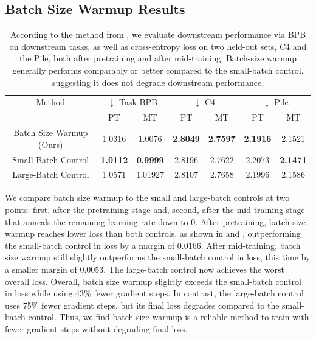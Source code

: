 \documentclass{article}
\begin{document}
\subsection{Batch Size Warmup Results}

\begin{table}[!t]
    \centering
    \begin{tabular}{c|cc|cc|cc}
        \toprule
        Method & \multicolumn{2}{c}{$\downarrow$ Task BPB} & \multicolumn{2}{|c|}{$\downarrow$ C4} & \multicolumn{2}{|c}{$\downarrow$ Pile} \\
        & PT & MT & PT & MT & PT & MT \\
        \midrule
        Batch Size Warmup (Ours) & 1.0316 & 1.0076 & \textbf{2.8049} & \textbf{2.7597} & \textbf{2.1916} & 2.1521 \\
        Small-Batch Control & \textbf{1.0112} & \textbf{0.9999} & 2.8196 & 2.7622 & 2.2073 & \textbf{2.1471} \\
        Large-Batch Control & 1.0571 & 1.01927 & 2.8107 & 2.7658 & 2.1996 & 2.1586 \\
        \bottomrule
    \end{tabular}
    \vspace{1em}
    \caption{According to the method from \cite{Bhagia2024EstablishingTS}, we evaluate downstream performance via BPB on downstream tasks, as well as cross-entropy loss on two held-out sets, C4 and the Pile, both after pretraining and after mid-training.
    Batch-size warmup generally performs comparably or better compared to the small-batch control, suggesting it does not degrade downstream performance.
    }
    \label{tab:downstream}
\end{table}

We compare batch size warmup to the small and large-batch controls at two points: first, after the pretraining stage and, second, after the mid-training stage that anneals the remaining learning rate down to 0.
After pretraining, batch size warmup reaches lower loss than both controls, as shown in  and , outperforming the small-batch control in loss by a margin of 0.0166.
After mid-training, batch size warmup still slightly outperforms the small-batch control in loss, this time by a smaller margin of 0.0053.
The large-batch control now achieves the worst overall loss.
% 
Overall, batch size warmup slightly exceeds the small-batch control in loss while using 43\% fewer gradient steps.
In contrast, the large-batch control uses 75\% fewer gradient steps, but its final loss degrades compared to the small-batch control.
Thus, we find batch size warmup is a reliable method to train with fewer gradient steps without degrading final loss.
\end{document}

